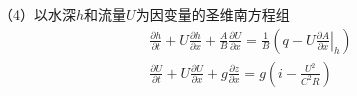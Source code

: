                                                               （4）以水深$h$和流量$U$为因变量的圣维南方程组
                                                              \begin{equation}
                                                                \begin{gathered}
                                                                  \frac{\partial h}{\partial t}
                                                                  +
                                                                  U\frac{\partial h}{\partial x}
                                                                  +
                                                                  \frac{A}{B}\frac{\partial U}{\partial x}
                                                                  =
                                                                  \frac{1}{B}
                                                                  \left(
                                                                    q - U\left.\frac{\partial A}{\partial x}\right|_{h}
                                                                    \right)
                                                                    \\
                                                                    \frac{\partial U}{\partial t}
                                                                    +
                                                                    U\frac{\partial U}{\partial x}
                                                                    +
                                                                    g\frac{\partial z}{\partial x}
                                                                    =
                                                                    g
                                                                    \left(
                                                                      i-\frac{U^{2}}{C^{2}R}
                                                                    \right)
                                                                  \end{gathered}
                                                                  \label{EqCGe_SV_hU}
                                                                \end{equation}

